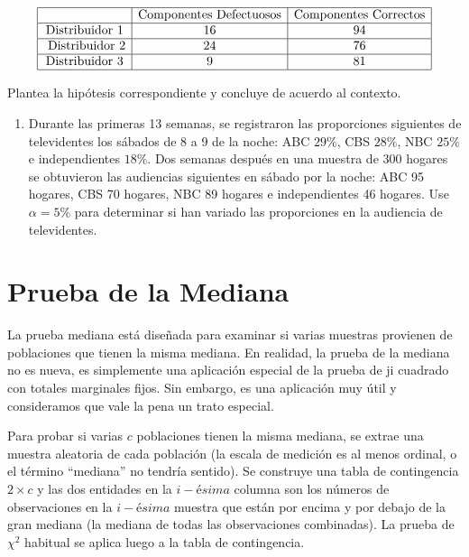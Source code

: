 \documentclass[
  a4paper,
  oneside,
  openany]{book}
\providecommand{\tightlist}{%
  \setlength{\itemsep}{0pt}\setlength{\parskip}{0pt}}
\begin{document}
\[
\begin{array}{|c | c| c|}
\hline
&\mbox{Componentes Defectuosos}& \mbox{Componentes Correctos}\\
   \hline
\mbox{Distribuidor 1}& 16& 94  \\
  \hline
\mbox{ Distribuidor 2}&24&76\\
 \hline
\mbox{Distribuidor 3}&9&81\\
    \hline
\end{array}
\]

Plantea la hipótesis correspondiente y concluye de acuerdo al contexto.

\begin{enumerate}
\def\labelenumi{\arabic{enumi}.}
\setcounter{enumi}{2}
\tightlist
\item
  Durante las primeras 13 semanas, se registraron las proporciones siguientes de televidentes los sábados de 8 a 9 de la noche: ABC \(29\%\), CBS \(28\%\), NBC \(25\%\) e independientes \(18\%\). Dos semanas después en una muestra de 300 hogares se obtuvieron las audiencias siguientes en sábado por la noche: ABC 95 hogares, CBS 70 hogares, NBC 89 hogares e independientes 46 hogares. Use \(\alpha=5\%\) para determinar si han variado las proporciones en la audiencia de televidentes.
\end{enumerate}

\hypertarget{prueba-de-la-mediana}{%
\chapter{Prueba de la Mediana}\label{prueba-de-la-mediana}}

La prueba mediana está diseñada para examinar si varias muestras provienen de poblaciones que tienen la misma mediana. En realidad, la prueba de la mediana no es nueva, es simplemente una aplicación especial de la prueba de ji cuadrado con totales marginales fijos. Sin embargo, es una aplicación muy útil y consideramos que vale la pena un trato especial.

Para probar si varias \(c\) poblaciones tienen la misma mediana, se extrae una muestra aleatoria de cada población (la escala de medición es al menos ordinal, o el término ``mediana'' no tendría sentido). Se construye una tabla de contingencia \(2\times c\) y las dos entidades en la \(i-ésima\) columna son los números de observaciones en la \(i-ésima\) muestra que están por encima y por debajo de la gran mediana (la mediana de todas las observaciones combinadas). La prueba de \(\chi^2\) habitual se aplica luego a la tabla de contingencia.
\end{document}
